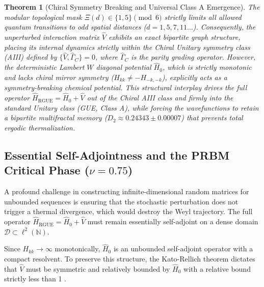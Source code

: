 \documentclass[aps,prl,preprint,superscriptaddress,floatfix]{revtex4-2}
\newtheorem{theorem}{Theorem}[section]
\newcommand{\N}{\mathbb{N}}
\begin{document}
\begin{theorem}[Chiral Symmetry Breaking and Universal Class A Emergence]
\label{thm:chiral_breaking}
The modular topological mask $\Xi(d) \in \{1,5\} \pmod 6$ strictly limits all allowed quantum transitions to \emph{odd} spatial distances ($d=1, 5, 7, 11\dots$). Consequently, the unperturbed interaction matrix $\hat{V}$ exhibits an exact bipartite graph structure, placing its internal dynamics strictly within the Chiral Unitary symmetry class (AIII) defined by $\{ \hat{V}, \hat{\Gamma}_C \} = 0$, where $\hat{\Gamma}_C$ is the parity grading operator. However, the deterministic Lambert $W$ diagonal potential $\hat{H}_0$, which is strictly monotonic and lacks chiral mirror symmetry ($H_{kk} \neq -H_{-k,-k}$), explicitly acts as a symmetry-breaking chemical potential. This structural interplay drives the full operator $\hat{H}_{\text{RGUE}} = \hat{H}_0 + \hat{V}$ out of the Chiral AIII class and firmly into the standard Unitary class (GUE, Class A), while forcing the wavefunctions to retain a bipartite multifractal memory ($D_2 \approx 0.24343 \pm 0.00007$) that prevents total ergodic thermalization.
\end{theorem}

\subsection{Essential Self-Adjointness and the PRBM Critical Phase (\texorpdfstring{$\nu = 0.75$}{nu = 0.75})}

A profound challenge in constructing infinite-dimensional random matrices for unbounded sequences is ensuring that the stochastic perturbation does not trigger a thermal divergence, which would destroy the Weyl trajectory. The full operator $\hat{H}_{\text{RGUE}} = \hat{H}_0 + \hat{V}$ must remain essentially self-adjoint on a dense domain $\mathcal{D} \subset \ell^2(\N)$.

Since $H_{kk} \to \infty$ monotonically, $\hat{H}_0$ is an unbounded self-adjoint operator with a compact resolvent. To preserve this structure, the Kato-Rellich theorem dictates that $\hat{V}$ must be symmetric and relatively bounded by $\hat{H}_0$ with a relative bound strictly less than 1 \cite{ReedSimon1975}. 
\end{document}
